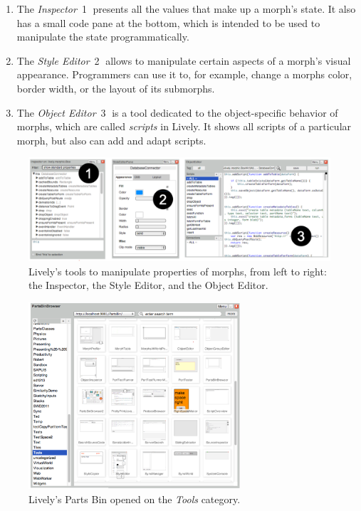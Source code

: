 \begin{enumerate}
    \item The \emph{Inspector}~\textcircled{1} presents all the values that make up a morph's state. It also has a small code pane at the bottom, which is intended to be used to manipulate the state programmatically.
    \item The \emph{Style Editor}~\textcircled{2} allows to manipulate certain aspects of a morph's visual appearance. Programmers can use it to, for example, change a morphs color, border width, or the layout of its submorphs.
    \item The \emph{Object Editor}~\textcircled{3} is a tool dedicated to the object-specific behavior of morphs, which are called \emph{scripts} in Lively. It shows all scripts of a particular morph, but also can add and adapt scripts.
\end{enumerate}


\begin{figure}[h]
    \centering
    \includegraphics[width=\textwidth]{figures/2_background/2_livelyTools.pdf}
    \caption{Lively's tools to manipulate properties of morphs, from left to right: the Inspector, the Style Editor, and the Object Editor.}
    \label{fig:LivelyTools}
\end{figure}

\begin{figure}[h]
    \centering
    \includegraphics[width=0.7\textwidth]{figures/2_background/3_partsBin.pdf}
    \caption{Lively's Parts Bin opened on the \emph{Tools} category.}
    \label{fig:PartsBin}
\end{figure}

